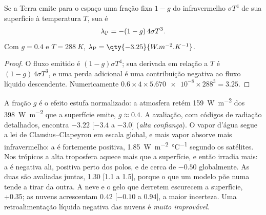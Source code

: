 \begin{proposition}\label{prop:b2:anthropogenic-climate-change:planck}
Se a Terra emite para o espaço uma fração fixa $1 - g$ do infravermelho $\sigma T^4$ de sua superfície à
temperatura $T$, sua  é
\[
  \lambda_{\text P} = -(1 - g)\,4\sigma T^3 .
\]
Com $g = 0.4$ e $T = \qty{288}{K}$, $\lambda_{\text P} = \qty{-3.25}{W.m^{-2}.K^{-1}}$.
\end{proposition}
\begin{proof}
O fluxo emitido é $(1 - g)\sigma T^4$; sua derivada em relação a $T$ é $(1 - g)\,4\sigma
T^3$, e uma perda adicional é uma contribuição negativa ao fluxo líquido descendente. Numericamente $0.6
\times 4 \times \num{5.670e-8} \times 288^3 = 3.25$.
\end{proof}

A fração $g$ é o efeito estufa normalizado: a atmosfera retém \qty{159}{W.m^{-2}} dos
\qty{398}{W.m^{-2}} que a superfície emite, $g \approx 0.4$. A avaliação, com códigos de radiação
detalhados, encontra $-3.22$ [$-3.4$ a $-3.0$] (\emph{alta confiança}). O vapor d'água segue
a lei de Clausius--Clapeyron em escala global, e mais vapor absorve mais infravermelho: a
 é fortemente positiva, \qty{1.85}{W.m^{-2}.\celsius^{-1}} segundo os satélites.
Nos trópicos a alta troposfera aquece mais que a superfície, e então irradia mais: a
 é negativa ali, positiva perto dos polos, e de cerca de $-0.50$ globalmente. As duas
são avaliadas juntas, \num{1.30} [1.1 a 1.5], porque o que um modelo põe numa tende a
tirar da outra. A neve e o gelo que derretem escurecem a superfície, +0.35; as nuvens acrescentam \num{0.42}
[$-0.10$ a $0.94$], a maior incerteza. Uma retroalimentação líquida negativa das nuvens é \emph{muito improvável}.

